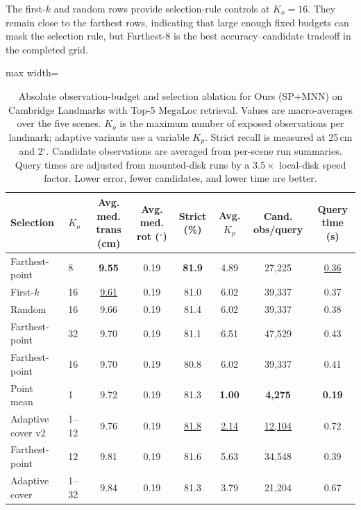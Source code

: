 \documentclass[letterpaper,10 pt,conference]{ieeeconf}
\begin{document}
The first-$k$ and random rows provide selection-rule controls at $K_o{=}16$. They remain close to the farthest rows, indicating that large enough fixed budgets can mask the selection rule, but Farthest-8 is the best accuracy--candidate tradeoff in the completed grid.

\begin{table}[!t]
    \centering
    \caption{Absolute observation-budget and selection ablation for Ours (SP+MNN) on Cambridge Landmarks with Top-5 MegaLoc retrieval. Values are macro-averages over the five scenes. $K_o$ is the maximum number of exposed observations per landmark; adaptive variants use a variable $K_p$. Strict recall is measured at 25\,cm and 2$^\circ$. Candidate observations are averaged from per-scene run summaries. Query times are adjusted from mounted-disk runs by a $3.5\times$ local-disk speed factor. Lower error, fewer candidates, and lower time are better.}
    \label{tab:ablation-budget}
    \setlength{\tabcolsep}{3.5pt}
    \begin{adjustbox}{max width=\textwidth}
    \begin{tabular}{@{}llcccccc@{}}
        \toprule
        Selection & $K_o$ & Avg. med. trans (cm) & Avg. med. rot ($^\circ$) & Strict (\%) & Avg. $K_p$ & Cand. obs/query & Query time (s) \\
        \midrule
        Farthest-point        & 8     & \textbf{9.55} & 0.19 & \textbf{81.9} & 4.89 & 27{,}225 & \underline{0.36} \\
        First-$k$             & 16    & \underline{9.61} & 0.19 & 81.0 & 6.02 & 39{,}337 & 0.37 \\
        Random                & 16    & 9.66 & 0.19 & 81.4 & 6.02 & 39{,}337 & 0.38 \\
        Farthest-point        & 32    & 9.70 & 0.19 & 81.1 & 6.51 & 47{,}529 & 0.43 \\
        Farthest-point        & 16    & 9.70 & 0.19 & 80.8 & 6.02 & 39{,}337 & 0.41 \\
        Point mean            & 1     & 9.72 & 0.19 & 81.3 & \textbf{1.00} & \textbf{4{,}275} & \textbf{0.19} \\
        Adaptive cover v2     & 1--12 & 9.76 & 0.19 & \underline{81.8} & \underline{2.14} & \underline{12{,}104} & 0.72 \\
        Farthest-point        & 12    & 9.81 & 0.19 & 81.6 & 5.63 & 34{,}548 & 0.39 \\
        Adaptive cover        & 1--32 & 9.84 & 0.19 & 81.3 & 3.79 & 21{,}204 & 0.67 \\

\end{tabular}
\end{adjustbox}
\end{table}
\end{document}
